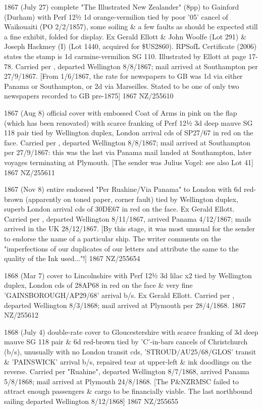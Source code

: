 \documentclass[justified]{tufte-book}
\begin{document}
%
{1867 (July 27) complete "The Illustrated New Zealander" (8pp) to Gainford (Durham) with Perf 12½ 1d orange-vermilion tied by poor '05' cancel of Waikouaiti (PO 2/2/1857), some soiling \& a few faults as should be expected still a fine exhibit, folded for display. Ex Gerald Ellott \& John Woolfe (Lot 291) \& Joseph Hackmey (I) (Lot 1440, acquired for \$US2860). RPSofL Certificate (2006) states the stamp is 1d carmine-vermilion SG 110. Illustrated by Ellott at page 17-78. Carried per , departed Wellington 8/8/1867; mail arrived at Southampton per  27/9/1867. [From 1/6/1867, the rate for newspapers to GB was 1d via either Panama or Southampton, or 2d via Marseilles. Stated to be one of only two newspapers recorded to GB pre-1875] }%
{1867}%
{NZ/255610}%
{}%
{}
{}%
{}

%
{1867 (Aug 8) official cover with embossed Coat of Arms in pink on the flap (which has been renovated) with scarce franking of Perf 12½ 3d deep mauve SG 118 pair tied by Wellington duplex, London arrival cds of SP27/67 in red on the face. Carried per , departed Wellington 8/8/1867; mail arrived at Southampton per  27/9/1867: this was the last via Panama mail landed at Southampton, later voyages terminating at Plymouth. [The sender was Julius Vogel: see also Lot 41]}%
{1867}%
{NZ/255611}%
{}%
{}
{}%
{}

%
{1867 (Nov 8) entire endorsed "Per Ruahine/Via Panama" to London with 6d red-brown (apparently on toned paper, corner fault) tied by Wellington duplex, superb London arrival cds of 30DE67 in red on the face. Ex Gerald Ellott. Carried per , departed Wellington 8/11/1867, arrived Panama 4/12/1867; mails arrived in the UK 28/12/1867. [By this stage, it was most unusual for the sender to endorse the name of a particular ship. The writer comments on the "imperfections of our duplicates of our letters and attribute the same to the quality of the Ink used..."!] }%
{1867}%
{NZ/255654}%
{}%
{}
{}%
{}

%
{1868 (Mar 7) cover to Lincolnshire with Perf 12½ 3d lilac x2 tied by Wellington duplex, London cds of 28AP68 in red on the face \& very fine 'GAINSBOROUGH/AP29/68' arrival b/s. Ex Gerald Ellott. Carried per , departed Wellington 8/3/1868; mail arrived at Plymouth per  28/4/1868.}%
{1867}%
{NZ/255612}%
{}%
{}
{}%
{}

%
{1868 (July 4) double-rate cover to Gloucestershire with scarce franking of 3d deep mauve SG 118 pair \& 6d red-brown tied by 'C'-in-bars cancels of Christchurch (b/s), unusually with no London transit cds, 'STROUD/AU25/68/GLOS' transit \& 'PAINSWICK' arrival b/s, repaired tear at upper-left \& ink doodlings on the reverse. Carried per "Ruahine", departed Wellington 8/7/1868, arrived Panama 5/8/1868; mail arrived at Plymouth 24/8/1868. [The P\&NZRMSC failed to attract enough passengers \& cargo to be financially viable. The last northbound sailing departed Wellington 8/12/1868] }%
{1867}%
{NZ/255655}%
{}%
{}
{}%
{}
\end{document}
